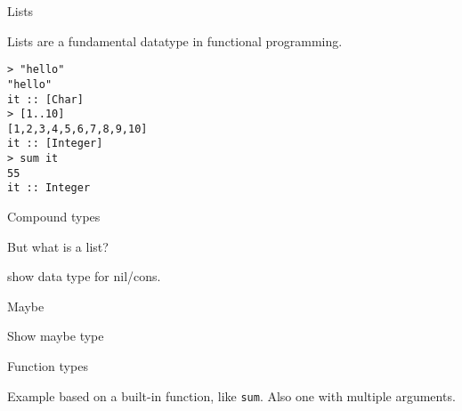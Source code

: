 %
\begin{frame}[fragile]{Lists}

Lists are a fundamental datatype in functional programming.

\begin{verbatim}
> "hello"
"hello"
it :: [Char]
> [1..10]
[1,2,3,4,5,6,7,8,9,10]
it :: [Integer]
> sum it
55
it :: Integer
\end{verbatim}

\end{frame}

%
\begin{frame}[fragile]{Compound types}

But what is a list?

show data type for nil/cons.

\end{frame}

%
\begin{frame}[fragile]{Maybe}

Show maybe type

\end{frame}

%
\begin{frame}[fragile]{Function types}

Example based on a built-in function, like \texttt{sum}. Also one with multiple
arguments.

\end{frame}

